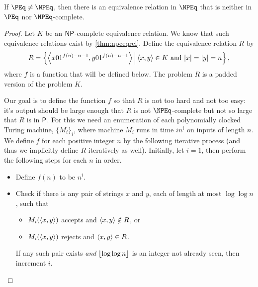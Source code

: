 \begin{theorem}\label{thm:intermediary}
  If $\PEq \neq \NPEq$, then there is an equivalence relation in $\NPEq$ that is neither in $\PEq$ nor $\NPEq$-complete.
\end{theorem}
\begin{proof}
  Let $K$ be an $\NP$-complete equivalence relation.
  We know that such equivalence relations exist by \autoref{thm:npceqrel}.
  Define the equivalence relation $R$ by
  \begin{equation*}
    R = \left\{\left\langle x 0 1^{f(n) - n - 1}, y 0 1^{f(n) - n - 1}\right\rangle \, \middle| \, \pair{x}{y} \in K \text{ and } |x| = |y| = n\right\},
  \end{equation*}
  where $f$ is a function that will be defined below.
  The problem $R$ is a padded version of the problem $K$.

  Our goal is to define the function $f$ so that $R$ is not too hard and not too easy: it's output should be large enough that $R$ is not $\NPEq$-complete but not so large that $R$ is in $\P$.
  For this we need an enumeration of each polynomially clocked Turing machine, $\{M_i\}_i$, where machine $M_i$ runs in time $i n^i$ on inputs of length $n$.
  We define $f$ for each positive integer $n$ by the following iterative process (and thus we implicitly define $R$ iteratively as well).
  Initially, let $i = 1$, then perform the following steps for each $n$ in order.
  \begin{itemize}
  \item Define $f(n)$ to be $n^i$.
  \item
    Check if there is any pair of strings $x$ and $y$, each of length at most $\log \log n$, such that
    \begin{itemize}
    \item $M_i(\pair{x}{y})$ accepts and $\pair{x}{y} \notin R$, or
    \item $M_i(\pair{x}{y})$ rejects and $\pair{x}{y} \in R$.
    \end{itemize}
    If any such pair exists \emph{and} $\floor{\log \log n}$ is an integer not already seen, then increment $i$.
  \end{itemize}


\end{proof}
